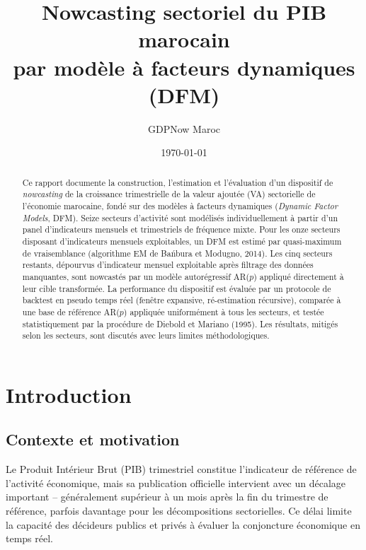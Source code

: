\documentclass[11pt,a4paper]{report}
\title{
  \vspace{-2cm}
  \Huge \textbf{Nowcasting sectoriel du PIB marocain} \\[0.4cm]
  \Large par modèle à facteurs dynamiques (DFM)
}
\author{GDPNow Maroc}
\date{\today}
\begin{document}
\maketitle
\thispagestyle{empty}

\begin{abstract}
\noindent
Ce rapport documente la construction, l'estimation et l'évaluation d'un dispositif de \emph{nowcasting} de la croissance trimestrielle de la valeur ajoutée (VA) sectorielle de l'économie marocaine, fondé sur des modèles à facteurs dynamiques (\emph{Dynamic Factor Models}, DFM). Seize secteurs d'activité sont modélisés individuellement à partir d'un panel d'indicateurs mensuels et trimestriels de fréquence mixte. Pour les onze secteurs disposant d'indicateurs mensuels exploitables, un DFM est estimé par quasi-maximum de vraisemblance (algorithme EM de Bańbura et Modugno, 2014). Les cinq secteurs restants, dépourvus d'indicateur mensuel exploitable après filtrage des données manquantes, sont nowcastés par un modèle autorégressif AR($p$) appliqué directement à leur cible transformée. La performance du dispositif est évaluée par un protocole de backtest en pseudo temps réel (fenêtre expansive, ré-estimation récursive), comparée à une base de référence AR($p$) appliquée uniformément à tous les secteurs, et testée statistiquement par la procédure de Diebold et Mariano (1995). Les résultats, mitigés selon les secteurs, sont discutés avec leurs limites méthodologiques.
\end{abstract}

\tableofcontents

\chapter{Introduction}

\section{Contexte et motivation}

Le Produit Intérieur Brut (PIB) trimestriel constitue l'indicateur de référence de l'activité économique, mais sa publication officielle intervient avec un décalage important -- généralement supérieur à un mois après la fin du trimestre de référence, parfois davantage pour les décompositions sectorielles. Ce délai limite la capacité des décideurs publics et privés à évaluer la conjoncture économique en temps réel.
\end{document}
